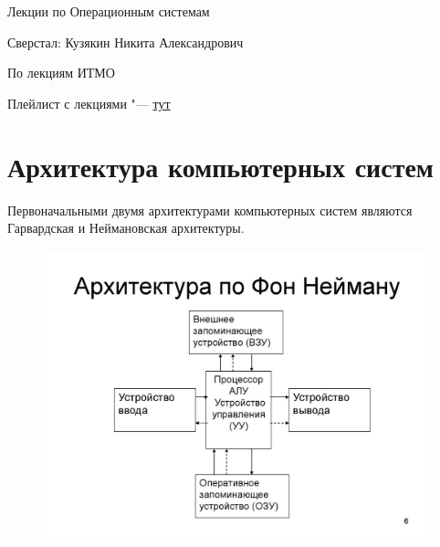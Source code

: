 \documentclass[bachelor, och, pract]{SCWorks}
\theoremstyle{remark}
\begin{document}
    \hfill \break
    \hfill \break
    \hfill \break
    \hfill \break
    \hfill \break
    \hfill \break
    \hfill \break
    \hfill \break
    \hfill \break
    \hfill \break
    \hfill \break
    \hfill \break
    \begin{center}
        \Huge Лекции по Операционным системам
    \end{center}
    \hfill \break
    \hfill \break
    \hfill \break
    \hfill \break
    \hfill \break
    \hfill \break
    \hfill \break
    \hfill \break
    \hfill \break

    \begin{center} Сверстал: Кузякин Никита Александрович \end{center}
    \begin{center} По лекциям ИТМО \end{center}
    \begin{center}Плейлист с лекциями "--- \href{https://www.youtube.com/watch?v=NctMiqgVRxA&list=PLBWafxh1dFuyGGcWXmR_EngRkoUWvDFJi&index=1}{тут}\end{center}
    \thispagestyle{empty} %
     
    \newpage
    \tableofcontents

    \section{Архитектура компьютерных систем}

    Первоначальными двумя архитектурами компьютерных систем являются Гарвардская и Неймановская архитектуры.

    \begin{figure}[H]
        \begin{center}
            \includegraphics[scale=0.7]{res/Neumann_architecture.png}
        \end{center}
    \end{figure}
\end{document}
